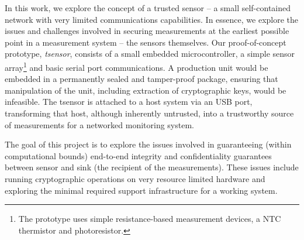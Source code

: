 In this work, we explore the concept of a trusted sensor -- a small self-contained network with very limited communications capabilities. In essence, we explore the issues and challenges involved in securing measurements at the earliest possible point in a measurement system -- the sensors themselves.
%
Our proof-of-concept prototype, \textit{tsensor}, consists of a small embedded microcontroller, a simple sensor array\footnote{The prototype uses simple resistance-based measurement devices, a NTC thermistor and photoresistor.} and basic serial port communications. A production unit would be embedded in a permanently sealed and tamper-proof package, ensuring that manipulation of the unit, including extraction of cryptographic keys, would be infeasible. 
The tsensor is attached to a host system via an USB port, transforming that host, although inherently untrusted, into a trustworthy source of measurements for a networked monitoring system.

The goal of this project is to explore the issues involved in guaranteeing (within computational bounds) end-to-end integrity and confidentiality guarantees between sensor and sink (the recipient of the measurements). These issues include running cryptographic operations on very resource limited hardware and exploring the minimal required support infrastructure for a working system.


%

